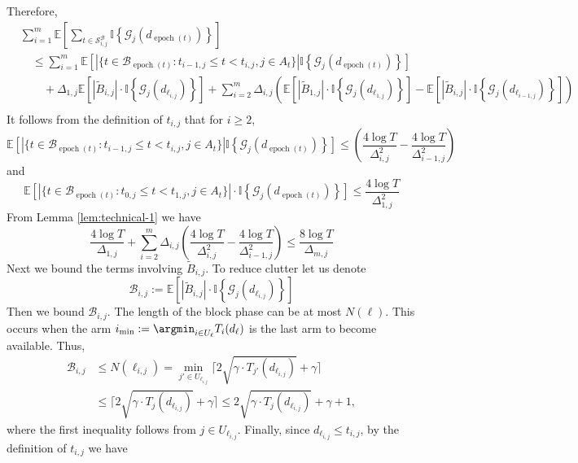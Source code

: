 \documentclass[opre,blindrev]{informs3}
\newcommand{\epoch}{\operatorname{epoch}}
\newcommand{\ind}[1]{\mathbb{I}\left\{#1\right\}}
\newcommand{\bE}[1]{{\mathbb{E}\left[#1\right]}}
\begin{document}
\begin{APPENDICES}
    Therefore,
    \begin{align*}
        &\sum_{i=1}^m\bE{\sum_{t \in \mathcal{S}^{\mathcal B}_{i,j}}\ind{\mathcal{G}_j(d_{\epoch(t)})}}\\
        &\quad \leq \sum_{i=1}^m\bE{|\{t\in \mathcal{B}_{\epoch(t)} : t_{i-1,j} \leq t < t_{i,j}, j\in A_t\}|\ind{ \mathcal{G}_j(d_{\epoch(t)})}}\\
        &\qquad + \Delta_{1,j}\bE{|\tilde{B}_{i,j}|\cdot \ind{\mathcal{G}_j(d_{\ell_{i,j}})}}+ \sum_{i=2}^m \Delta_{i,j}\left(\bE{|\tilde{B}_{1,j}|\cdot \ind{\mathcal{G}_j(d_{\ell_{1,j}})}} -  \bE{|\tilde{B}_{i,j}|\cdot \ind{\mathcal{G}_j(d_{\ell_{i-1,j}})}}\right)\\
    \end{align*}
    It follows from the definition of \(t_{i,j}\) that for \(i \geq 2\),
    \[\bE{|\{t\in \mathcal{B}_{\epoch(t)} : t_{i-1,j} \leq t < t_{i,j}, j\in A_t\}|\ind{ \mathcal{G}_j(d_{\epoch(t)})}}\leq \left(\frac{4\log T}{\Delta_{i,j}^2} - \frac{4\log T}{\Delta_{i-1,j}^2}\right)\]
    and 
    \[\bE{|\{t\in \mathcal{B}_{\epoch(t)} : t_{0,j} \leq t < t_{1,j}, j\in A_t\}|\cdot \ind{ \mathcal{G}_j(d_{\epoch(t)})}}\leq \frac{4\log T}{\Delta_{1,j}^2}\]
    From Lemma \ref{lem:technical-1} we have 
    \begin{equation}\label{eq:block-pull-bound-1}
        \frac{4\log T}{\Delta_{1,j}}+\sum_{i=2}^m \Delta_{i,j}\left(\frac{4\log T}{\Delta_{i,j}^2} - \frac{4\log T}{\Delta_{i-1,j}^2}\right)\leq \frac{8\log T}{\Delta_{m,j}}
    \end{equation}
    Next we bound the terms involving \(\tilde{B}_{i,j}\). To reduce clutter let us denote 
    \[\mathcal{B}_{i,j}:=\bE{|\tilde{B}_{i,j}|\cdot \ind{\mathcal{G}_j(d_{\ell_{i,j}})}}\]
    Then we bound \(\mathcal{B}_{i,j}\). The length of the block phase can be at most \(N(\ell)\). This occurs when the arm \(i_{\min}:=\argmin_{i\in U_\ell} T_i(d_\ell)\) is the last arm to become available. Thus,
    \begin{align*}
        \mathcal{B}_{i,j} 
        &\leq N(\ell_{i,j})  
        = \min_{j' \in U_{\ell_{i,j}}} \Big\lceil 2\sqrt{\gamma \cdot T_{j'}(d_{\ell_{i,j}})} + \gamma \Big\rceil \\
        &\leq \Big\lceil 2\sqrt{\gamma \cdot T_j(d_{\ell_{i,j}})} + \gamma \Big\rceil
        \leq 2\sqrt{\gamma \cdot T_j(d_{\ell_{i,j}})} + \gamma + 1,
    \end{align*}
    where the first inequality follows from $j \in U_{\ell_{i,j}}$. Finally, since \(d_{\ell_{i,j}} \leq t_{i,j}\), by the definition of \(t_{i,j}\) we have

\end{APPENDICES}
\end{document}
